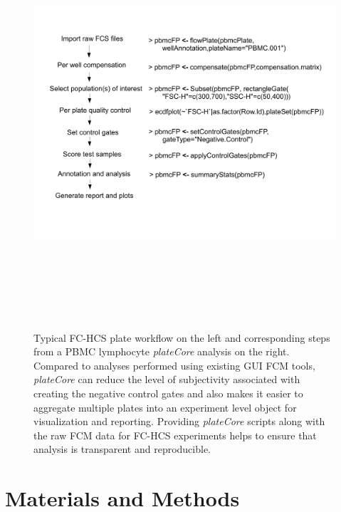 \documentclass[12pt]{article}
\newcommand{\Rpackage}[1]{{\textit{#1}}}
\begin{document}
\begin{figure}
\centering
\includegraphics[width=7in,height=6in]{analysisSteps.pdf}
\caption{Typical FC-HCS plate workflow on the left and corresponding steps from a PBMC lymphocyte \Rpackage{plateCore} analysis on the right.
Compared to analyses performed using existing GUI FCM tools, \Rpackage{plateCore} can reduce the level of subjectivity associated with creating
the negative control gates and also makes it easier to aggregate multiple plates into an experiment level object for visualization and reporting.
Providing \Rpackage{plateCore} scripts along with the raw FCM data for FC-HCS experiments helps to ensure that analysis is transparent and reproducible.
}
\label{fig:analysis}
\end{figure}
 
\clearpage
\section*{Materials and Methods}
\end{document}
